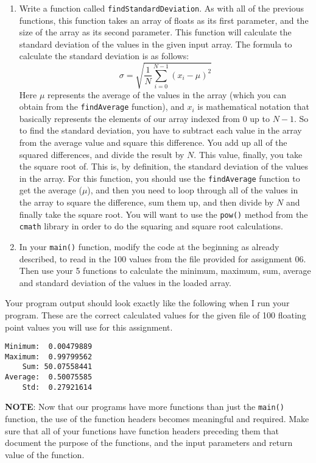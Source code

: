 \documentclass[11pt]{article}
\begin{document}
\begin{enumerate}
\item Write a function called \verb~findStandardDeviation~.  As with all of the
   previous functions, this function takes an array of floats as its
   first parameter, and the size of the array as its second parameter.
   This function will calculate the standard deviation of the values
   in the given input array.  The formula to calculate the standard deviation
   is as follows:
   $$
   \sigma = \sqrt{\frac{1}{N} \sum_{i=0}^{N-1} (x_i - \mu)^2}
   $$
   Here $\mu$ represents the average of the values in the array (which
   you can obtain from the \verb~findAverage~ function), and $x_i$ is
   mathematical notation that basically represents the elements of our
   array indexed from $0$ up to $N-1$.  So to find the standard
   deviation, you have to subtract each value in the array from the
   average value and square this difference.  You add up all of the
   squared differences, and divide the result by $N$.  This value,
   finally, you take the square root of.  This is, by definition, the
   standard deviation of the values in the array.  For this function,
   you should use the \verb~findAverage~ function to get the average
   ($\mu$), and then you need to loop through all of the values in the
   array to square the difference, sum them up, and then divide by $N$
   and finally take the square root.  You will want to use the \verb~pow()~
   method from the \verb~cmath~ library in order to do the squaring and
   square root calculations.
\item In your \verb~main()~ function, modify the code at the beginning as
   already described, to read in the 100 values from the file provided
   for assignment 06.  Then use your 5 functions to calculate the
   minimum, maximum, sum, average and standard deviation of the values
   in the loaded array.
\end{enumerate}

Your program output should look exactly like the following when I run
your program. These are the correct calculated values for the given
file of 100 floating point values you will use for this assignment.


\begin{verbatim}
Minimum:  0.00479889
Maximum:  0.99799562
    Sum: 50.07558441
Average:  0.50075585
    Std:  0.27921614
\end{verbatim}


\textbf{NOTE}: Now that our programs have more functions than just the
\verb~main()~ function, the use of the function headers becomes meaningful
and required.  Make sure that all of your functions have function
headers preceding them that document the purpose of the functions, and
the input parameters and return value of the function.
\end{document}
